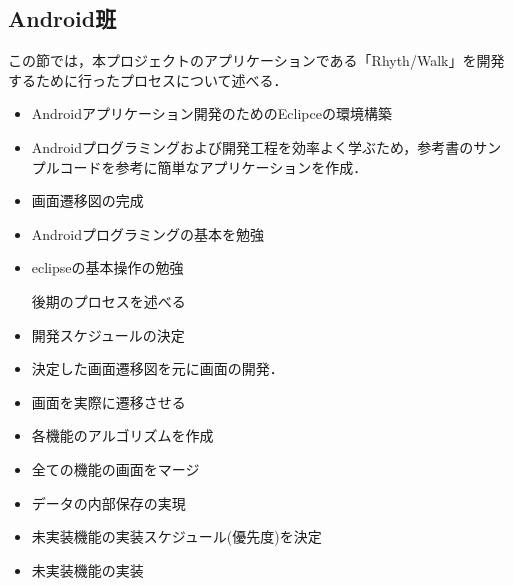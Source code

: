 \subsection{Android班}

\par この節では，本プロジェクトのアプリケーションである「Rhyth/Walk」を開発するために行ったプロセスについて述べる．

\begin{itemize}

\item Androidアプリケーション開発のためのEclipceの環境構築
\item Androidプログラミングおよび開発工程を効率よく学ぶため，参考書のサンプルコードを参考に簡単なアプリケーションを作成．
\item 画面遷移図の完成
\item Androidプログラミングの基本を勉強
\item eclipseの基本操作の勉強

\par 後期のプロセスを述べる
\item 開発スケジュールの決定
\item 決定した画面遷移図を元に画面の開発．
\item 画面を実際に遷移させる
\item 各機能のアルゴリズムを作成
\item 全ての機能の画面をマージ
\item データの内部保存の実現
\item 未実装機能の実装スケジュール(優先度)を決定
\item 未実装機能の実装

\end{itemize}
 
